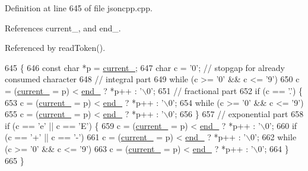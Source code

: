 Definition at line 645 of file jsoncpp.\+cpp.



References current\+\_\+, and end\+\_\+.



Referenced by read\+Token().


\begin{DoxyCode}
645                         \{
646   \textcolor{keyword}{const} \textcolor{keywordtype}{char} *p = \hyperlink{class_json_1_1_reader_a2f2feb5201a26da7aa133d2f7434479b}{current\_};
647   \textcolor{keywordtype}{char} c = \textcolor{charliteral}{'0'}; \textcolor{comment}{// stopgap for already consumed character}
648   \textcolor{comment}{// integral part}
649   \textcolor{keywordflow}{while} (c >= \textcolor{charliteral}{'0'} && c <= \textcolor{charliteral}{'9'})
650     c = (\hyperlink{class_json_1_1_reader_a2f2feb5201a26da7aa133d2f7434479b}{current\_} = p) < \hyperlink{class_json_1_1_reader_a714793579cbf4ee7c5a7223d2c8d77c1}{end\_} ? *p++ : \textcolor{charliteral}{'\(\backslash\)0'};
651   \textcolor{comment}{// fractional part}
652   \textcolor{keywordflow}{if} (c == \textcolor{charliteral}{'.'}) \{
653     c = (\hyperlink{class_json_1_1_reader_a2f2feb5201a26da7aa133d2f7434479b}{current\_} = p) < \hyperlink{class_json_1_1_reader_a714793579cbf4ee7c5a7223d2c8d77c1}{end\_} ? *p++ : \textcolor{charliteral}{'\(\backslash\)0'};
654     \textcolor{keywordflow}{while} (c >= \textcolor{charliteral}{'0'} && c <= \textcolor{charliteral}{'9'})
655       c = (\hyperlink{class_json_1_1_reader_a2f2feb5201a26da7aa133d2f7434479b}{current\_} = p) < \hyperlink{class_json_1_1_reader_a714793579cbf4ee7c5a7223d2c8d77c1}{end\_} ? *p++ : \textcolor{charliteral}{'\(\backslash\)0'};
656   \}
657   \textcolor{comment}{// exponential part}
658   \textcolor{keywordflow}{if} (c == \textcolor{charliteral}{'e'} || c == \textcolor{charliteral}{'E'}) \{
659     c = (\hyperlink{class_json_1_1_reader_a2f2feb5201a26da7aa133d2f7434479b}{current\_} = p) < \hyperlink{class_json_1_1_reader_a714793579cbf4ee7c5a7223d2c8d77c1}{end\_} ? *p++ : \textcolor{charliteral}{'\(\backslash\)0'};
660     \textcolor{keywordflow}{if} (c == \textcolor{charliteral}{'+'} || c == \textcolor{charliteral}{'-'})
661       c = (\hyperlink{class_json_1_1_reader_a2f2feb5201a26da7aa133d2f7434479b}{current\_} = p) < \hyperlink{class_json_1_1_reader_a714793579cbf4ee7c5a7223d2c8d77c1}{end\_} ? *p++ : \textcolor{charliteral}{'\(\backslash\)0'};
662     \textcolor{keywordflow}{while} (c >= \textcolor{charliteral}{'0'} && c <= \textcolor{charliteral}{'9'})
663       c = (\hyperlink{class_json_1_1_reader_a2f2feb5201a26da7aa133d2f7434479b}{current\_} = p) < \hyperlink{class_json_1_1_reader_a714793579cbf4ee7c5a7223d2c8d77c1}{end\_} ? *p++ : \textcolor{charliteral}{'\(\backslash\)0'};
664   \}
665 \}
\end{DoxyCode}
\mbox{\label{class_json_1_1_reader_a0068eb3d8e86e91f0e4806f60da66b9c}} 
